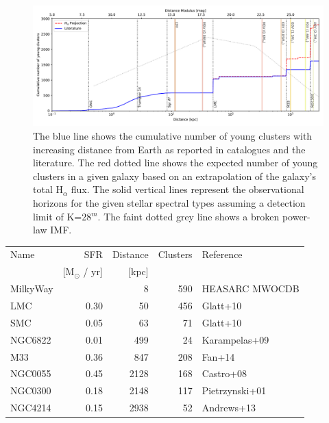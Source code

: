 \begin{figure}

    \centering
    \includegraphics[width=\textwidth]{images/young_clusters_within_2Mpc_incl_MW}

    \caption{The blue line shows the cumulative number of young clusters with
    increasing distance from Earth as reported in catalogues and the literature.
    The red dotted line shows the expected number of young clusters in a given
    galaxy based on an extrapolation of the galaxy's total H$_\alpha$ flux. The
    solid vertical lines represent the observational horizons for the given
    stellar spectral types assuming a detection limit of K=28$^m$. The faint
    dotted grey line shows a broken power-law IMF.
    }
    \label{fig:resolved_stellar_densities}

\end{figure}


\begin{table}[]
    \begin{tabular}{lrrrl}
    Name     & SFR                  & Distance  & Clusters   & Reference      \\
             & [M$_\odot$ / yr]     & [kpc]     &            &                \\
    MilkyWay &                      & 8         & 590        & HEASARC MWOCDB \\
    LMC      & 0.30                 & 50        & 456        & Glatt+10       \\
    SMC      & 0.05                 & 63        & 71         & Glatt+10       \\
    NGC6822  & 0.01                 & 499       & 24         & Karampelas+09  \\
    M33      & 0.36                 & 847       & 208        & Fan+14         \\
    NGC0055  & 0.45                 & 2128      & 168        & Castro+08      \\
    NGC0300  & 0.18                 & 2148      & 117        & Pietrzynski+01 \\
    NGC4214  & 0.15                 & 2938      & 52         & Andrews+13     \\
    \end{tabular}
\end{table}









